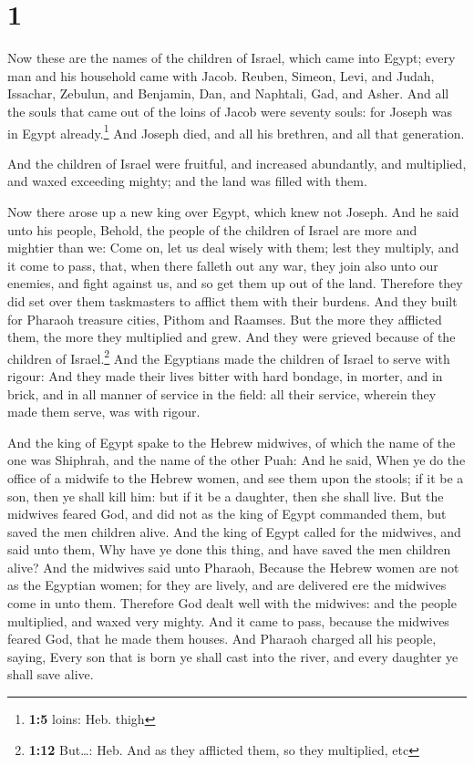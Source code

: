 \hypertarget{section}{%
\section{1}\label{section}}

 Now these are the names of the children of Israel, which
came into Egypt; every man and his household came with Jacob.
 Reuben, Simeon, Levi, and Judah,  Issachar,
Zebulun, and Benjamin,  Dan, and Naphtali, Gad, and Asher.
 And all the souls that came out of the loins of Jacob
were seventy souls: for Joseph was in Egypt already.\footnote{\textbf{1:5}
  loins: Heb. thigh}  And Joseph died, and all his
brethren, and all that generation.

 And the children of Israel were fruitful, and increased
abundantly, and multiplied, and waxed exceeding mighty; and the land was
filled with them.

 Now there arose up a new king over Egypt, which knew not
Joseph.  And he said unto his people, Behold, the people
of the children of Israel are more and mightier than we: 
Come on, let us deal wisely with them; lest they multiply, and it come
to pass, that, when there falleth out any war, they join also unto our
enemies, and fight against us, and so get them up out of the land.
 Therefore they did set over them taskmasters to afflict
them with their burdens. And they built for Pharaoh treasure cities,
Pithom and Raamses.  But the more they afflicted them,
the more they multiplied and grew. And they were grieved because of the
children of Israel.\footnote{\textbf{1:12} But\ldots: Heb. And as they
  afflicted them, so they multiplied, etc}  And the
Egyptians made the children of Israel to serve with rigour:
 And they made their lives bitter with hard bondage, in
morter, and in brick, and in all manner of service in the field: all
their service, wherein they made them serve, was with rigour.

 And the king of Egypt spake to the Hebrew midwives, of
which the name of the one was Shiphrah, and the name of the other Puah:
 And he said, When ye do the office of a midwife to the
Hebrew women, and see them upon the stools; if it be a son, then ye
shall kill him: but if it be a daughter, then she shall live.
 But the midwives feared God, and did not as the king of
Egypt commanded them, but saved the men children alive. 
And the king of Egypt called for the midwives, and said unto them, Why
have ye done this thing, and have saved the men children alive?
 And the midwives said unto Pharaoh, Because the Hebrew
women are not as the Egyptian women; for they are lively, and are
delivered ere the midwives come in unto them.  Therefore
God dealt well with the midwives: and the people multiplied, and waxed
very mighty.  And it came to pass, because the midwives
feared God, that he made them houses.  And Pharaoh
charged all his people, saying, Every son that is born ye shall cast
into the river, and every daughter ye shall save alive.

